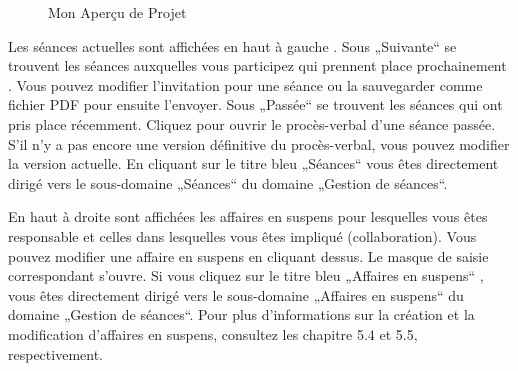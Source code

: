\begin{figure}[H] %
\caption{Mon Aperçu de Projet}
\end{figure}

Les séances actuelles sont affichées en haut à gauche . Sous „Suivante“ se trouvent les séances auxquelles vous participez qui prennent place prochainement . Vous pouvez modifier l'invitation pour une séance ou la sauvegarder comme fichier PDF pour ensuite l'envoyer. Sous „Passée“ se trouvent les séances qui ont pris place récemment. Cliquez pour ouvrir le procès-verbal d'une séance passée. S'il n'y a pas encore une version définitive du procès-verbal, vous pouvez modifier la version actuelle. En cliquant sur le titre bleu „Séances“  vous êtes directement dirigé vers le sous-domaine „Séances“ du domaine „Gestion de séances“.

\vspace{\baselineskip}

En haut à droite sont affichées les affaires en suspens  pour lesquelles vous êtes responsable et celles dans lesquelles vous êtes impliqué (collaboration). Vous pouvez modifier une affaire en suspens en cliquant dessus. Le masque de saisie correspondant s'ouvre. Si vous cliquez sur le titre bleu „Affaires en suspens“ , vous êtes directement dirigé vers le sous-domaine „Affaires en suspens“ du domaine „Gestion de séances“. Pour plus d'informations sur la création et la modification d'affaires en suspens, consultez les chapitre 5.4 et 5.5, respectivement.

